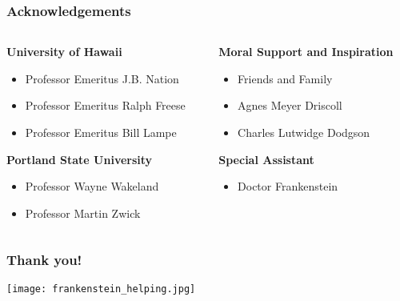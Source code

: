 \documentclass[
	11pt, %
]{beamer}
\begin{document}
\begin{frame}
	\frametitle{Acknowledgements}
	
	\begin{columns}[t] 
		\begin{column}{0.45\textwidth}
			\textbf{University of Hawaii}
			\begin{itemize}
				\item Professor Emeritus J.B. Nation
				\item Professor Emeritus Ralph Freese
				\item Professor Emeritus Bill Lampe
			\end{itemize}
			\textbf{Portland State University}
			\begin{itemize}
				\item Professor Wayne Wakeland
				\item Professor Martin Zwick
			\end{itemize}
		\end{column}		
		\begin{column}{0.45\textwidth}
			\textbf{Moral Support and Inspiration}
			\begin{itemize}
				\item Friends and Family
				\item Agnes Meyer Driscoll
                \item Charles Lutwidge Dodgson
			\end{itemize}
            \textbf{Special Assistant}
            \begin{itemize}
                \item Doctor Frankenstein
            \end{itemize}
		\end{column}
	\end{columns}
\end{frame}

\begin{frame}
    \frametitle{Thank you!}

    \begin{center}
        \texttt{[image: frankenstein\_helping.jpg]}
    \end{center}
\end{frame}
\end{document}
